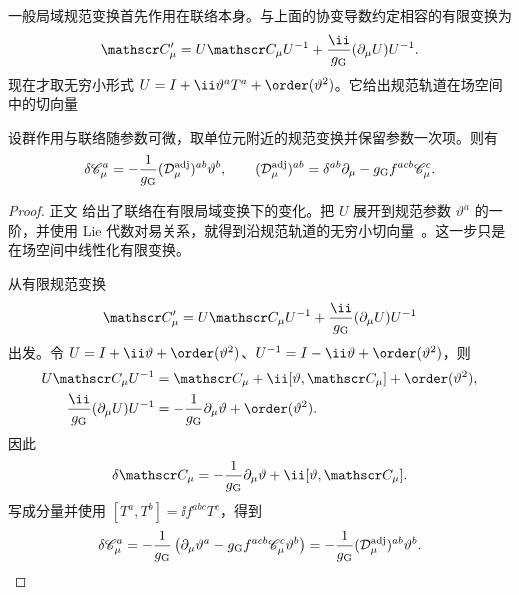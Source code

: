 一般局域规范变换首先作用在联络本身。与上面的协变导数约定相容的有限变换为
\begin{equation}
{
 \mathscr C_\mu'
 =U\mathscr C_\mu U^{-1}
 +\frac{\ii}{g_{\rm G}}(\partial_\mu U)U^{-1}.}
\label{eq:generic-finite-gauge-transform-dp68}
\end{equation}
现在才取无穷小形式 $U=I+\ii\vartheta^aT^a+\order(\vartheta^2)$。它给出规范轨道在场空间中的切向量


\begin{proposition}[有限规范变换的无穷小形式]
设群作用与联络随参数可微，取单位元附近的规范变换并保留参数一次项。则有
\begin{equation}
 {
 \delta\mathscr C_\mu^a
 =-\frac1{g_{\rm G}}(\mathcal D_\mu^{\rm adj})^{ab}\vartheta^b,
 \qquad
 (\mathcal D_\mu^{\rm adj})^{ab}
 =\delta^{ab}\partial_\mu-g_{\rm G}f^{acb}\mathscr C_\mu^c.}
\label{eq:generic-infinitesimal-gauge-dp11}
\end{equation}
\end{proposition}
\begin{proof}
正文 给出了联络在有限局域变换下的变化。把 $U$ 展开到规范参数 $\vartheta^a$ 的一阶，并使用 Lie 代数对易关系，就得到沿规范轨道的无穷小切向量~。这一步只是在场空间中线性化有限变换。

从有限规范变换
\begin{equation*}
 \mathscr C_\mu'
 =U\mathscr C_\mu U^{-1}
 +\frac{\ii}{g_{\rm G}}(\partial_\mu U)U^{-1}
\end{equation*}
出发。令 $U=I+\ii\vartheta+\order(\vartheta^2)$、$U^{-1}=I-\ii\vartheta+\order(\vartheta^2)$，则
\begin{align*}
 U\mathscr C_\mu U^{-1}
 &=\mathscr C_\mu+\ii[\vartheta,\mathscr C_\mu]+\order(\vartheta^2),\\
 \frac{\ii}{g_{\rm G}}(\partial_\mu U)U^{-1}
 &=-\frac1{g_{\rm G}}\partial_\mu\vartheta+\order(\vartheta^2).
\end{align*}
因此
\begin{equation*}
 \delta\mathscr C_\mu
 =-\frac1{g_{\rm G}}\partial_\mu\vartheta+\ii[\vartheta,\mathscr C_\mu].
\end{equation*}
写成分量并使用 $[T^a,T^b]=\ii f^{abc}T^c$，得到
\begin{equation*}
 \delta\mathscr C_\mu^a
 =-\frac1{g_{\rm G}}\left(\partial_\mu\vartheta^a-g_{\rm G}f^{acb}\mathscr C_\mu^c\vartheta^b\right)
 =-\frac1{g_{\rm G}}(\mathcal D_\mu^{\rm adj})^{ab}\vartheta^b.
\end{equation*}
\end{proof}


